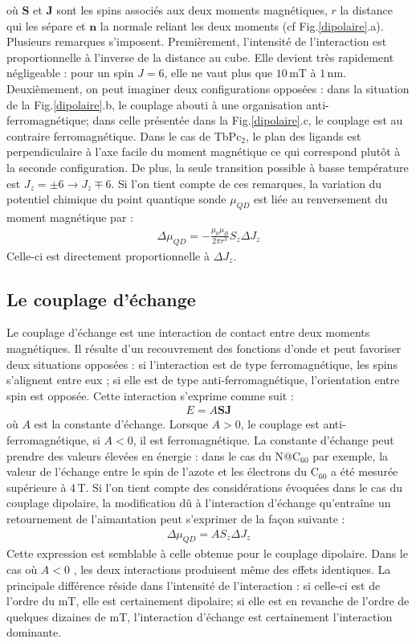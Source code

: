 où $\mathbf{S}$ et $\mathbf{J}$ sont les spins associés aux deux moments magnétiques, $r$ la distance qui les sépare et $\mathbf{n}$ la normale reliant les deux moments (cf Fig.\ref{dipolaire}.a). Plusieurs remarques s'imposent. Premièrement, l'intensité de l'interaction est proportionnelle à l'inverse de la distance au cube. Elle devient très rapidement négligeable : pour un spin $J=6$, elle ne vaut plus que $10$\,mT à $1$\,nm. Deuxièmement, on peut imaginer deux configurations opposées : dans la situation de la Fig.\ref{dipolaire}.b, le couplage abouti à une organisation anti-ferromagnétique; dans celle présentée dans la Fig.\ref{dipolaire}.c, le couplage est au contraire ferromagnétique. Dans le cas de TbPc$_2$, le plan des ligands est perpendiculaire à l'axe facile du moment magnétique ce qui correspond plutôt à la seconde configuration. De plus, la seule transition possible à basse température est $J_z=\pm6 \rightarrow J_z \mp 6$. Si l'on tient compte de ces remarques, la variation du potentiel chimique du point quantique sonde $\mu_{QD}$ est liée au renversement du moment magnétique par :
\begin{eqnarray}
\Delta \mu_{QD} = -\frac{\mu_0 \mu_B}{2\pi r^3}S_z\Delta J_z\nonumber
\end{eqnarray}
Celle-ci est directement proportionnelle à $\Delta J_z$.

\subsection{Le couplage d'échange}
Le couplage d'échange est une interaction de contact entre deux moments magnétiques. Il résulte d'un recouvrement des fonctions d'onde et peut favoriser deux situations opposées : si l'interaction est de type ferromagnétique, les spins s'alignent entre eux ; si elle est de type anti-ferromagnétique, l'orientation entre spin est opposée. Cette interaction s'exprime comme suit :
\begin{eqnarray}
E = A\mathbf{SJ} \nonumber
\end{eqnarray}
où $A$ est la constante d'échange. Lorsque $A>0$, le couplage est anti-ferromagnétique, si $A<0$, il est ferromagnétique. La constante d'échange peut prendre des valeurs élevées en énergie : dans le cas du N@C$_{60}$ par exemple, la valeur de l'échange entre le spin de l'azote et les électrons du C$_{60}$ a été mesurée supérieure à 4\,T. Si l'on tient compte des considérations évoquées dans le cas du couplage dipolaire, la modification d\^u à l'interaction d'échange qu’entraîne un retournement de l'aimantation peut s'exprimer de la façon suivante :
\begin{eqnarray}
\Delta \mu_{QD} = AS_z\Delta J_z\nonumber
\end{eqnarray}
Cette expression est semblable à celle obtenue pour le couplage dipolaire. Dans le cas où $A<0$ , les deux interactions produisent même des effets identiques. La principale différence réside dans l'intensité de l'interaction : si celle-ci est de l'ordre du mT, elle est certainement dipolaire; si elle est en revanche de l'ordre de quelques dizaines de mT, l'interaction d'échange est certainement l'interaction dominante.

